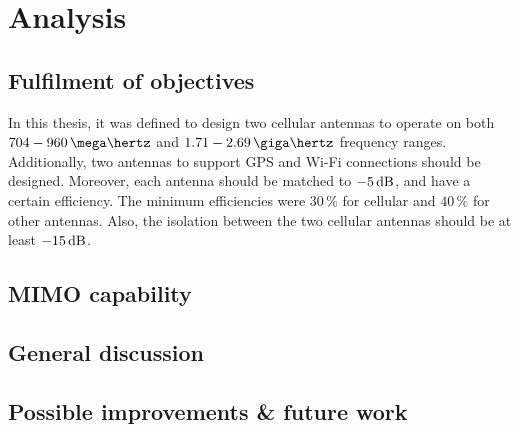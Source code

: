 \section{Analysis}
\label{sec:analysis}


\subsection{Fulfilment of objectives}
\label{sec:fulfilment}
In this thesis, it was defined to design two cellular antennas to operate on both $704-960\,\mega\hertz$ and $1.71-2.69\,\giga\hertz$ frequency ranges. Additionally, two antennas to support GPS and Wi-Fi connections should be designed. Moreover, each antenna should be matched to $-5\,\mathrm{dB}$, and have a certain efficiency. The minimum efficiencies were $30\,\%$ for cellular and $40\,\%$ for other antennas. Also, the isolation between the two cellular antennas should be at least $-15\,\mathrm{dB}$.



\subsection{MIMO capability}
\label{sec:mimo_cap}

\subsection{General discussion}
\label{sec:general_discussion}

\subsection{Possible improvements \& future work}
\label{sec:improvements}



\clearpage